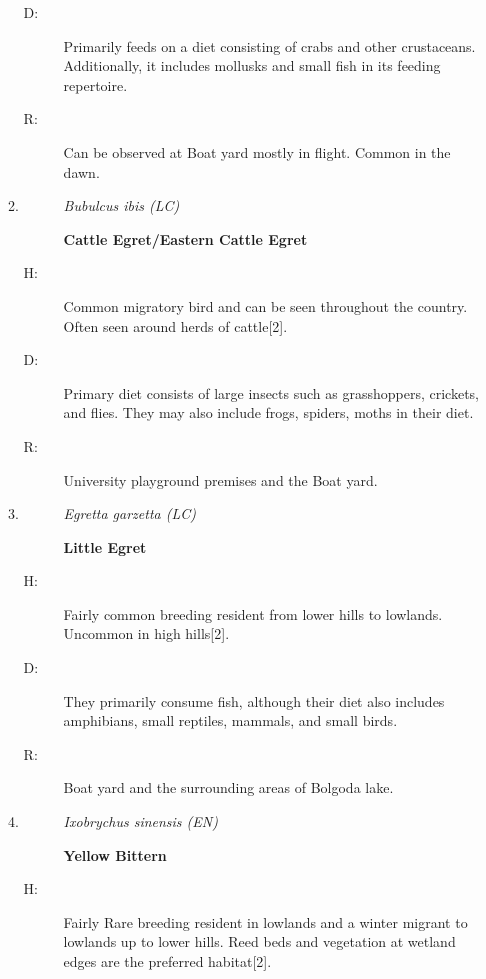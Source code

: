 \begin{itemize}
\begin{enumerate}
\begin{description}
\item[D: ]%
Primarily feeds on a diet consisting of crabs and other crustaceans. Additionally, it includes mollusks and small fish in its feeding repertoire.%
\item[R: ]%
Can be observed at Boat yard mostly in flight. Common in the dawn.%
\end{description}%
\item%
\begin{description}%
\item[]%
\textit{Bubulcus ibis (LC)}%
\item[]%
\textbf{Cattle Egret/Eastern Cattle Egret}%
\end{description}%
\begin{description}%
\item[H: ]%
Common migratory bird and can be seen throughout the country. Often seen around herds of cattle{[}2{]}.%
\item[D: ]%
Primary diet consists of large insects such as grasshoppers, crickets, and flies. They may also include frogs, spiders, moths in their diet.%
\item[R: ]%
University playground premises and the Boat yard.%
\end{description}%
\item%
\begin{description}%
\item[]%
\textit{Egretta garzetta (LC)}%
\item[]%
\textbf{Little Egret}%
\end{description}%
\begin{description}%
\item[H: ]%
Fairly common breeding resident from lower hills to lowlands. Uncommon in high hills{[}2{]}.%
\item[D: ]%
They primarily consume fish, although their diet also includes amphibians, small reptiles, mammals, and small birds.%
\item[R: ]%
Boat yard and the surrounding areas of Bolgoda lake.%
\end{description}%
\item%
\begin{description}%
\item[]%
\textit{Ixobrychus sinensis (EN)}%
\item[]%
\textbf{Yellow Bittern}%
\end{description}%
\begin{description}%
\item[H: ]%
Fairly Rare breeding resident in lowlands and a winter migrant to lowlands up to lower hills. Reed beds and vegetation at wetland edges are the preferred habitat{[}2{]}.%

\end{description}
\end{enumerate}
\end{itemize}
